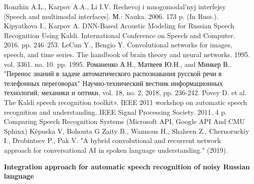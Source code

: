 \documentclass[conference]{IEEEtran}
\begin{document}
\begin{thebibliography}{00}
 Ronzhin A.L., Karpov A.A., Li I.V. Rechevoj i mnogomodal'nyj interfejsy [Speech and multimodal interfaces]. М.: Nauka. 2006. 173 p. (In Russ.).
 Kipyatkova I., Karpov A. DNN-Based Acoustic Modeling for Russian Speech Recognition Using Kaldi. International Conference on Speech and Computer. 2016. pp. 246–253.
 LeCun Y., Bengio Y. Convolutional networks for images, speech, and time series. The handbook of brain theory and neural networks. 1995. vol. 3361. no. 10. pp. 1995.
 Романенко А.Н., Матвеев Ю.Н., and Минкер В.. "Перенос знаний в задаче автоматического распознавания русской речи в телефонных переговорах" Научно-технический вестник информационных технологий, механики и оптики, vol. 18, no. 2, 2018, pp. 236-242.
 Povey D. et al. The Kaldi speech recognition toolkit». IEEE 2011 workshop on automatic speech recognition and understanding. IEEE Signal Processing Society. 2011. 4 p.
 Comparing Speech Recognition Systems (Microsoft API, Google API And CMU Sphinx) Këpuska V, Bohouta G
 Zaity B., Wannous H., Shaheen Z., Chernoruckiy I., Drobintsev P., Pak V. "A hybrid convolutional and recurrent network approach for conversational AI in spoken language understanding." (2019).

\end{thebibliography}
\vspace{12pt}


\begin{center}
\textbf{Integration approach for automatic speech recognition of noisy Russian language}


\end{center}
\end{document}
